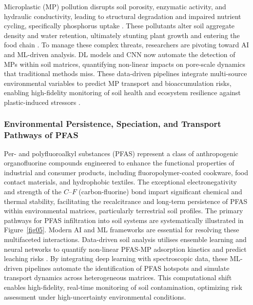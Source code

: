 \documentclass[preprint,12pt]{elsarticle}            %
\begin{document}
Microplastic (MP) pollution disrupts soil porosity, enzymatic activity, and
hydraulic conductivity, leading to structural degradation and impaired
nutrient cycling, specifically phosphorus uptake
\cite{Akdogan2019,Zhou2024,Wang2022}. These pollutants alter soil aggregate
density and water retention, ultimately stunting plant growth and entering
the food chain \cite{Jing2023,LindhLemenkova2023d,Chenetal2025}. To manage
these complex threats, researchers are pivoting toward AI and ML-driven
analysis. DL models and CNN now automate the detection of MPs within soil
matrices, quantifying non-linear impacts on pore-scale dynamics that
traditional methods miss. These data-driven pipelines integrate multi-source
environmental variables to predict MP transport and bioaccumulation risks,
enabling high-fidelity monitoring of soil health and ecosystem resilience
against plastic-induced stressors \cite{Chen2020,LindhLemenkova2023e}.

\subsubsection{Environmental Persistence, Speciation, and Transport Pathways
    of PFAS}\label{sec2.1.4}

Per- and polyfluoroalkyl substances (PFAS) represent a class of anthropogenic
organofluorine compounds engineered to enhance the functional properties of
industrial and consumer products, including fluoropolymer-coated cookware,
food contact materials, and hydrophobic textiles. The exceptional
electronegativity and strength of the $C$--$F$ (carbon-fluorine) bond impart
significant chemical and thermal stability, facilitating the recalcitrance
and long-term persistence of PFAS within environmental matrices, particularly
terrestrial soil profiles. The primary pathways for PFAS infiltration into
soil systems are systematically illustrated in Figure~\ref{fig05}. Modern AI
and ML frameworks are essential for resolving these multifaceted interactions.
Data-driven soil analysis utilises ensemble learning and neural networks to
quantify non-linear PFAS-MP adsorption kinetics and predict leaching risks
\cite{Xu2023}. By integrating deep learning with spectroscopic data, these
ML-driven pipelines automate the identification of PFAS hotspots and simulate
transport dynamics across heterogeneous matrices. This computational shift
enables high-fidelity, real-time monitoring of soil contamination, optimizing
risk assessment under high-uncertainty environmental conditions.
\end{document}
